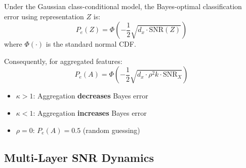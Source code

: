 \begin{theorem}
\label{thm:bayes_error}
Under the Gaussian class-conditional model, the Bayes-optimal classification error using representation $Z$ is:
\begin{equation}
    P_e(Z) = \Phi\left(-\frac{1}{2}\sqrt{d_x \cdot \mathrm{SNR}(Z)}\right)
\end{equation}
where $\Phi(\cdot)$ is the standard normal CDF.

Consequently, for aggregated features:
\begin{equation}
    P_e(A) = \Phi\left(-\frac{1}{2}\sqrt{d_x \cdot \rho^2 k \cdot \mathrm{SNR}_X}\right)
\end{equation}
\begin{itemize}
    \item $\kappa > 1$: Aggregation \textbf{decreases} Bayes error
    \item $\kappa < 1$: Aggregation \textbf{increases} Bayes error
    \item $\rho = 0$: $P_e(A) = 0.5$ (random guessing)
\end{itemize}
\end{theorem}

\subsection{Multi-Layer SNR Dynamics}
\label{subsec:multilayer}

